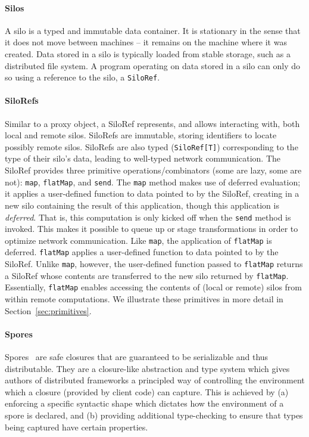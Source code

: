 \documentclass[10pt]{sigplanconf}
\theoremstyle{definition}
\theoremstyle{definition}
\begin{document}
\paragraph{Silos}

A silo is a typed and immutable data container. It is stationary in the sense
that it does not move between machines -- it remains on the machine where it was
created. Data stored in a silo is typically loaded from stable storage, such as
a distributed file system. A program operating on data stored in a silo can only
do so using a reference to the silo, a \verb|SiloRef|.

\paragraph{SiloRefs}

Similar to a proxy object, a SiloRef represents, and allows interacting with,
both local and remote silos. SiloRefs are immutable, storing identifiers to
locate possibly remote silos. SiloRefs are also typed (\verb|SiloRef[T]|)
corresponding to the type of their silo's data, leading to well-typed network
communication. The SiloRef provides three primitive operations/combinators (some
are lazy, some are not): \verb|map|, \verb|flatMap|, and \verb|send|. The
\verb|map| method makes use of deferred evaluation; it applies a user-defined
function to data pointed to by the SiloRef, creating in a new silo containing
the result of this application, though this application is \textit{deferred}.
That is, this computation is only kicked off when the \verb|send| method is
invoked. This makes it possible to queue up or stage transformations in order to
optimize network communication. Like \verb|map|, the application of
\verb|flatMap| is deferred. \verb|flatMap| applies a user-defined function to
data pointed to by the SiloRef. Unlike \verb|map|, however, the user-defined
function passed to \verb|flatMap| returns a SiloRef whose contents are
transferred to the new silo returned by \verb|flatMap|. Essentially,
\verb|flatMap| enables accessing the contents of (local or remote) silos from
within remote computations. We illustrate these primitives in more detail in
Section~\ref{sec:primitives}.

\paragraph{Spores}

Spores~\cite{Spores} are safe closures that are guaranteed to be serializable
and thus distributable. They are a closure-like abstraction and type system
which gives authors of distributed frameworks a principled way of controlling
the environment which a closure (provided by client code) can capture. This is
achieved by (a) enforcing a specific syntactic shape which dictates how the
environment of a spore is declared, and (b) providing additional type-checking
to ensure that types being captured have certain properties.
\end{document}
